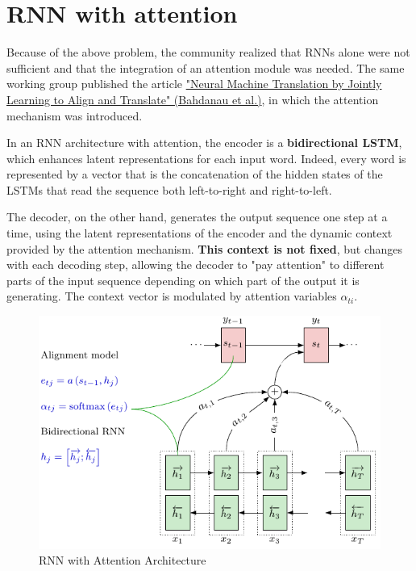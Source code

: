 \section{RNN with attention}

Because of the above problem, the community realized that RNNs alone were not sufficient and that the integration of an attention module was needed. The same working group published the article \href{https://arxiv.org/pdf/1409.0473}{"Neural Machine Translation by Jointly Learning to Align and Translate" (Bahdanau et al.)}, in which the attention mechanism was introduced. 

In an RNN architecture with attention, the encoder is a \textbf{bidirectional LSTM}, which enhances latent representations for each input word. Indeed, every word is represented by a vector that is the concatenation of the hidden states of the LSTMs that read the sequence both left-to-right and right-to-left.

The decoder, on the other hand, generates the output sequence one step at a time, using the latent representations of the encoder and the dynamic context provided by the attention mechanism. \textbf{This context is not fixed}, but changes with each decoding step, allowing the decoder to "pay attention" to different parts of the input sequence depending on which part of the output it is generating. The context vector is modulated by attention variables $\alpha_{ti}$.

\begin{figure}[!htbp]
    \centering
    \includegraphics[width=0.7\linewidth]{tikz/chapter7 - RNN with Attention.pdf}
    \caption{RNN with Attention Architecture}
\end{figure}


